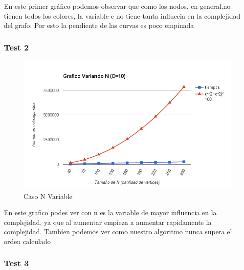 En este primer gráfico podemos observar que como los nodos, en general,no tienen todos los colores, la variable c no tiene tanta influecia en la complejidad del grafo. Por esto la pendiente de las curvas es poco empinada

\subsubsection{Test 2}

\vspace*{0.3cm}

\begin{figure}[H]
  \begin{center}
      \includegraphics[scale=0.75]{../Ejercicio3VariandoN.png}
  \end{center}
  \caption{Caso N Variable}
\end{figure}

En este grafico podes ver con n es la variable de mayor influencia en la complejidad, ya que al aumentar empieza a aumentar rapidamente la complejidad. Tambíen podemos ver como nuestro algoritmo nunca supera el orden calculado


\subsubsection{Test 3}

\vspace*{0.3cm}

